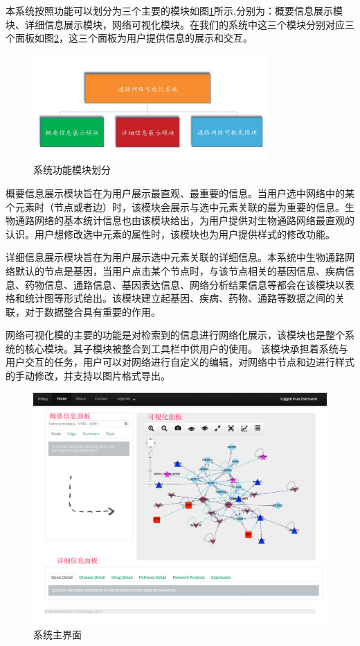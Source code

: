 本系统按照功能可以划分为三个主要的模块如图\ref{fig32}所示,分别为：概要信息展示模块、详细信息展示模块，网络可视化模块。在我们的系统中这三个模块分别对应三个面板如图\ref{UI}，这三个面板为用户提供信息的展示和交互。

\begin{figure}[h]
\centering
\includegraphics[width = 0.8\textwidth]{module}
\caption[fig32]{系统功能模块划分}
\label{fig32}
\end{figure}

概要信息展示模块旨在为用户展示最直观、最重要的信息。当用户选中网络中的某个元素时（节点或者边）时，该模块会展示与选中元素关联的最为重要的信息。生物通路网络的基本统计信息也由该模块给出，为用户提供对生物通路网络最直观的认识。用户想修改选中元素的属性时，该模块也为用户提供样式的修改功能。

详细信息展示模块旨在为用户展示选中元素关联的详细信息。本系统中生物通路网络默认的节点是基因，当用户点击某个节点时，与该节点相关的基因信息、疾病信息、药物信息、通路信息、基因表达信息、网络分析结果信息等都会在该模块以表格和统计图等形式给出。该模块建立起基因、疾病、药物、通路等数据之间的关联，对于数据整合具有重要的作用。

网络可视化模的主要的功能是对检索到的信息进行网络化展示，该模块也是整个系统的核心模块。其子模块被整合到工具栏中供用户的使用。 该模块承担着系统与用户交互的任务，用户可以对网络进行自定义的编辑，对网络中节点和边进行样式的手动修改，并支持以图片格式导出。



\begin{figure}[h]
\centering
\includegraphics[width = 1.0\textwidth]{UI}
\caption[UI]{系统主界面}
\label{UI}
\end{figure}

